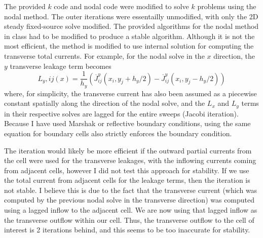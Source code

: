 \documentclass[12pt]{article}
\newenvironment{solnum}[2][Solution]{\begin{trivlist}
\item[\hskip \labelsep {\bfseries #1}\hskip \labelsep {\bfseries #2:}]\hspace{0.3in}\newline\newline}{\end{trivlist}}
\begin{document}
\begin{solnum}{1-2}

The provided $k$ code and nodal code were modified to solve $k$ problems using the
nodal method.  The outer iterations were essentailly unmodified, with only the 2D
steady fixed-source solve modified.
The provided algorithms for the nodal method in class had to be modified to produce a
stable algorithm. Although it
is not the most efficient, the method is modified to use internal solution for
computing the transverse total currents.  For example, for the nodal solve in the $x$
direction, the $y$ transverse leakage term becomes
\begin{equation*}
  L_y,ij(x) = \frac{1}{h_y}\left(\overline{J}^y_{ij}(x_i,y_j+h_y/2) -
  \overline{J}^y_{ij}(x_i,y_j-h_y/2) \right)
\end{equation*}
where, for simplicity, the transverse current has also been assumed as a piecewise
constant spatially along the direction of the nodal solve, and the $L_x$ and $L_y$
terms in their respective solves are lagged for the entire sweeps (Jacobi
iteration). Because I have used Marshak or reflective boundary conditions, using the
same equation for boundary cells also strictly enforces the boundary condition.

The iteration would
likely be more efficient if the outward partial currents from the cell were used for
the transverse leakages, with the inflowing currents coming from adjacent cells, however I did not test this approach
for stability.  If we use the total current from adjacent cells for the leakage
terms, then the iteration is not stable.  I believe this is due to
the fact that the transverse 
current (which was computed by the previous nodal solve in the transverse direction)
was computed using a lagged inflow to the adjacent cell.  We are now using that
lagged inflow as the transverse outflow within our cell.  Thus, the transverse outflow to the
cell of interest is 2 iterations behind, and this seems to be too inaccurate for
stability.  


\end{solnum}
\end{document}
